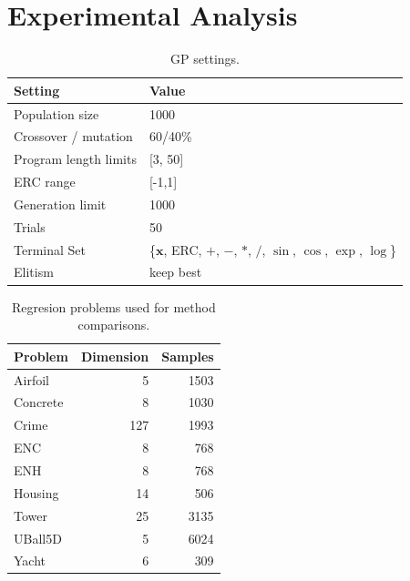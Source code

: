 \documentclass[preprint]{article}
\begin{document}
\section{Experimental Analysis} \label{s:4}

\begin{table}
\scriptsize
\caption{GP settings.}\label{tbl:symreg_settings}
\begin{tabularx}{\columnwidth}{X R{0.57\columnwidth}} \toprule
Setting& Value \\ \midrule
Population size & 1000 \\
Crossover / mutation & 60/40\% \\
Program length limits & [3, 50] \\ 
ERC range & [-1,1] \\
Generation limit & 1000 \\
Trials & 50 \\
Terminal Set & \{$\mathbf{x}$, ERC, $+$, $-$, $*$, $/$, $\sin$, $\cos$, $\exp$, $\log$\}\\
Elitism & keep best \\
\end{tabularx}
\end{table}
\begin{table}
\scriptsize
\caption{Regresion problems used for method comparisons.}\label{tbl:regression}
\begin{tabularx}{\columnwidth}{X r r } \toprule
Problem & Dimension & Samples \\ \midrule
Airfoil & 5	& 1503 \\
Concrete	& 	8	& 1030	\\
Crime	&	127	&	1993	\\
ENC & 8 & 768 \\
ENH & 8 & 768 \\
Housing & 14 & 506 \\
Tower & 25 & 3135 \\
UBall5D & 5 & 6024 \\ 
Yacht	& 6	&	309	\\ \midrule
\end{tabularx}
\end{table}
\end{document}
